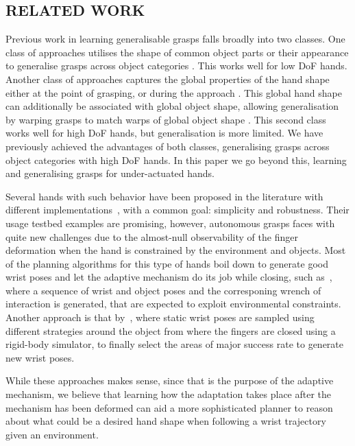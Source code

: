 \subsection{RELATED WORK}
Previous work in learning generalisable grasps falls broadly into two classes. One class of approaches utilises the shape of common object parts or their appearance to generalise grasps across object categories \cite{saxena2008b,detry2013a,herzog2014a, kroemer2012a}. This works well for low DoF hands. Another class of approaches captures the global properties of the hand shape either at the point of grasping, or during the approach \cite{ben2012generalization}. This global hand shape can additionally be associated with global object shape, allowing generalisation by warping grasps to match warps of global object shape \cite{hillenbrand2012transferring}. This second class works well for high DoF hands, but generalisation is more limited. We have previously achieved the advantages of both classes, generalising grasps across object categories with high DoF hands. In this paper we go beyond this, learning and generalising grasps for under-actuated hands.

Several hands with such behavior have been proposed in the literature with different implementations~\cite{Catalano2014Adaptive, Dollar2010Highly}, with a common goal: simplicity and robustness. Their usage testbed examples are promising, however, autonomous grasps faces with quite new challenges due to the almost-null observability of the finger deformation when the hand is constrained by the environment and objects. Most of the planning algorithms for this type of hands boil down to generate good wrist poses and let the adaptive mechanism do its job while closing, such as~\cite{Eppner2015Planning}, where a sequence of wrist and object poses and the corresponing wrench of interaction is generated, that are expected to exploit environmental constraints. Another approach is that by~\cite{Bonilla2014Grasping,Bonilla2015Grasp}, where static wrist poses are sampled using different strategies around the object from where the fingers are closed using a rigid-body simulator, to finally select the areas of major success rate to generate new wrist poses.

While these approaches makes sense, since that is the purpose of the adaptive mechanism, we believe that learning how the adaptation takes place after the mechanism has been deformed can aid a more sophisticated planner to reason about what could be a desired hand shape when following a wrist trajectory given an environment.
